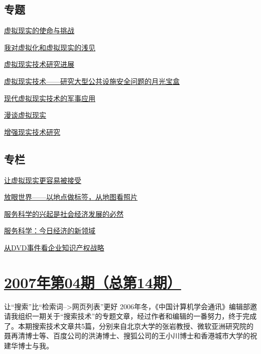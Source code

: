 \documentclass[a4paper]{article}
\begin{document}
\subsection{专题}
\href{http://history.ccf.org.cn/resources/1190201776262/2010/04/15/015016.pdf}{虚拟现实的使命与挑战}

\href{http://history.ccf.org.cn/resources/1190201776262/2010/04/15/015018.pdf}{我对虚拟化和虚拟现实的浅见}

\href{http://history.ccf.org.cn/resources/1190201776262/2010/04/15/015022.pdf}{虚拟现实技术研究进展}

\href{http://history.ccf.org.cn/resources/1190201776262/2010/04/15/015032.pdf}{虚拟现实技术——研究大型公共设施安全问题的月光宝盒}

\href{http://history.ccf.org.cn/resources/1190201776262/2010/04/15/015038.pdf}{现代虚拟现实技术的军事应用}

\href{http://history.ccf.org.cn/resources/1190201776262/2010/04/15/015045.pdf}{漫谈虚拟现实}

\href{http://history.ccf.org.cn/resources/1190201776262/2010/04/15/015058.pdf}{增强现实技术研究}

\subsection{专栏}
\href{http://history.ccf.org.cn/resources/1190201776262/2010/04/15/015066.pdf}{让虚拟现实更容易被接受}

\href{http://history.ccf.org.cn/resources/1190201776262/2010/04/15/015071.pdf}{放眼世界——以地点做标签，从地图看照片}

\href{http://history.ccf.org.cn/resources/1190201776262/2010/04/15/015076.pdf}{服务科学的兴起是社会经济发展的必然}

\href{http://history.ccf.org.cn/resources/1190201776262/2010/04/15/015079.pdf}{服务科学：今日经济的新领域}

\href{http://history.ccf.org.cn/resources/1190201776262/2010/04/15/015083.pdf}{从DVD事件看企业知识产权战略}


\section{\href{http://history.ccf.org.cn/sites/ccf/jsjtbbd.jsp?contentId=2542567628959}{\textbf{2007年第04期（总第14期）}}}
让“搜索”比“检索词-->网页列表”更好 2006年冬，《中国计算机学会通讯》编辑部邀请我组织一期关于“搜索技术”的专题文章，经过作者和编辑的一番努力，终于完成了。本期搜索技术文章共5篇，分别来自北京大学的张岩教授、微软亚洲研究院的聂再清博士等、百度公司的洪涛博士、搜狐公司的王小川博士和香港城市大学的祝建华博士与我。
\end{document}
